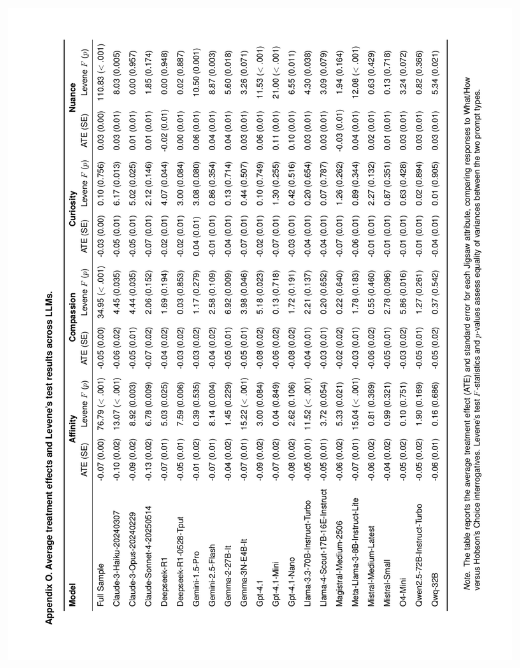 \documentclass[
  12pt,
]{article}
\begin{document}
\begin{center}\includegraphics{../03_outputs/04_appendices/appendix_o_i} \end{center}
\end{document}
